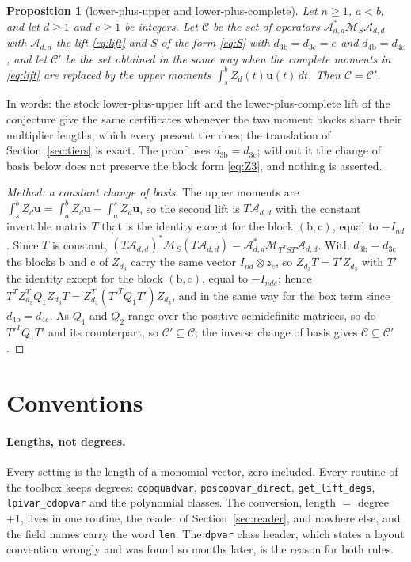 \documentclass[12pt]{article}
\newcommand{\mcl}[1]{\mathcal{#1}}
\newcommand{\mbf}[1]{\mathbf{#1}}
\newcommand{\code}[1]{\texttt{#1}}
\newcommand{\bb}{\mathrm{b}}
\newcommand{\bc}{\mathrm{c}}
\theoremstyle{plain}
\newtheorem{proposition}[theorem]{Proposition}
\theoremstyle{definition}
\theoremstyle{remark}
\begin{document}
\begin{proposition}[lower-plus-upper and lower-plus-complete]\label{prop:span}
Let $n\ge1$, $a<b$, and let $d\ge1$ and $e\ge1$ be integers. Let $\mcl C$ be the set of operators $\mcl A_{d,d}^*\mcl M_S\mcl A_{d,d}$ with $\mcl A_{d,d}$ the lift \eqref{eq:lift} and $S$ of the form \eqref{eq:S} with $d_{3\bb}=d_{3\bc}=e$ and $d_{4\bb}=d_{4\bc}$, and let $\mcl C'$ be the set obtained in the same way when the complete moments in \eqref{eq:lift} are replaced by the upper moments $\int_s^bZ_d(t)\mbf u(t)\,dt$. Then $\mcl C=\mcl C'$.
\end{proposition}
In words: the stock lower-plus-upper lift and the lower-plus-complete lift of the conjecture give the same certificates whenever the two moment blocks share their multiplier lengths, which every present tier does; the translation of Section~\ref{sec:tiers} is exact. The proof uses $d_{3\bb}=d_{3\bc}$; without it the change of basis below does not preserve the block form \eqref{eq:Z3}, and nothing is asserted.

\begin{proof}[Method: a constant change of basis]
The upper moments are $\int_s^bZ_d\mbf u=\int_a^bZ_d\mbf u-\int_a^sZ_d\mbf u$, so the second lift is $T\mcl A_{d,d}$ with the constant invertible matrix $T$ that is the identity except for the block $(\bb,\bc)$, equal to $-I_{nd}$. Since $T$ is constant, $(T\mcl A_{d,d})^*\mcl M_S(T\mcl A_{d,d})=\mcl A_{d,d}^*\mcl M_{T^TST}\mcl A_{d,d}$. With $d_{3\bb}=d_{3\bc}$ the blocks $\bb$ and $\bc$ of $Z_{d_3}$ carry the same vector $I_{nd}\otimes z_e$, so $Z_{d_3}T=T'Z_{d_3}$ with $T'$ the identity except for the block $(\bb,\bc)$, equal to $-I_{nde}$; hence $T^TZ_{d_3}^TQ_1Z_{d_3}T=Z_{d_3}^T(T'^TQ_1T')Z_{d_3}$, and in the same way for the box term since $d_{4\bb}=d_{4\bc}$. As $Q_1$ and $Q_2$ range over the positive semidefinite matrices, so do $T'^TQ_1T'$ and its counterpart, so $\mcl C'\subseteq\mcl C$; the inverse change of basis gives $\mcl C\subseteq\mcl C'$.
\end{proof}

\section{Conventions}\label{sec:conv}

\paragraph{Lengths, not degrees.} Every setting is the length of a monomial vector, zero included. Every routine of the toolbox keeps degrees: \code{copquadvar}, \code{poscopvar\_direct}, \code{get\_lift\_degs}, \code{lpivar\_cdopvar} and the polynomial classes. The conversion, length $=$ degree $+1$, lives in one routine, the reader of Section~\ref{sec:reader}, and nowhere else, and the field names carry the word \code{len}. The \code{dpvar} class header, which states a layout convention wrongly and was found so months later, is the reason for both rules.
\end{document}
